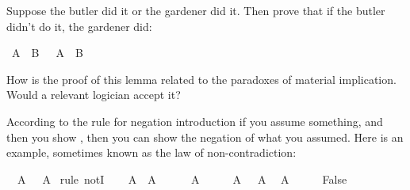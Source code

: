 \begin{isabellebody}
%
\endisatagproof
{\isafoldproof}%
%
\isadelimproof
%
\endisadelimproof
%
\begin{isamarkuptext}%
\begin{Exercise} Suppose the butler did it or the gardener did it. Then prove that if the butler didn't do it, 
the gardener did: \end{Exercise}%
\end{isamarkuptext}\isamarkuptrue%
\isamarkupfalse%
\ {\isachardoublequoteopen}A\ {\isasymor}\ B\ {\isasymlongrightarrow}\ {\isasymnot}\ A\ {\isasymlongrightarrow}\ B{\isachardoublequoteclose}%
\isadelimproof
\ %
\endisadelimproof
%
\isatagproof
{}\isamarkupfalse%
%
\endisatagproof
{\isafoldproof}%
%
\isadelimproof
%
\endisadelimproof
%
\begin{isamarkuptext}%
How is the proof of this lemma related to the paradoxes of material implication. Would a
relevant logician accept it?%
\end{isamarkuptext}\isamarkuptrue%
%
\isamarkuptrue%
%
\begin{isamarkuptext}%
According to the rule for negation introduction if you assume something, and then you show
, then you can show the negation of what you assumed. Here is an example, sometimes
known as the law of non-contradiction:%
\end{isamarkuptext}\isamarkuptrue%
\isamarkupfalse%
\ {\isachardoublequoteopen}{\isasymnot}\ {\isacharparenleft}A\ {\isasymand}\ {\isasymnot}\ A{\isacharparenright}{\isachardoublequoteclose}\isanewline
%
\isadelimproof
%
\endisadelimproof
%
\isatagproof
{}\isamarkupfalse%
\ {\isacharparenleft}rule\ notI{\isacharparenright}\isanewline
\ \ \isamarkupfalse%
\ {\isachardoublequoteopen}A\ {\isasymand}\ {\isasymnot}A{\isachardoublequoteclose}\isanewline
\ \ \isamarkupfalse%
\ {\isachardoublequoteopen}\ {\isasymnot}\ A{\isachardoublequoteclose}\isacommand{{\isachardot}{\isachardot}}\isamarkupfalse%
\isanewline
\ \ \isamarkupfalse%
\ \isamarkupfalse%
\ {\isacharbackquoteopen}A\ {\isasymand}\ {\isasymnot}\ A{\isacharbackquoteclose}\ \isamarkupfalse%
\ {\isachardoublequoteopen}A{\isachardoublequoteclose}\isacommand{{\isachardot}{\isachardot}}\isamarkupfalse%
\isanewline
\ \ \isamarkupfalse%
\ \isamarkupfalse%
\ {\isachardoublequoteopen}False{\isachardoublequoteclose}\ \isamarkupfalse%

\end{isabellebody}
